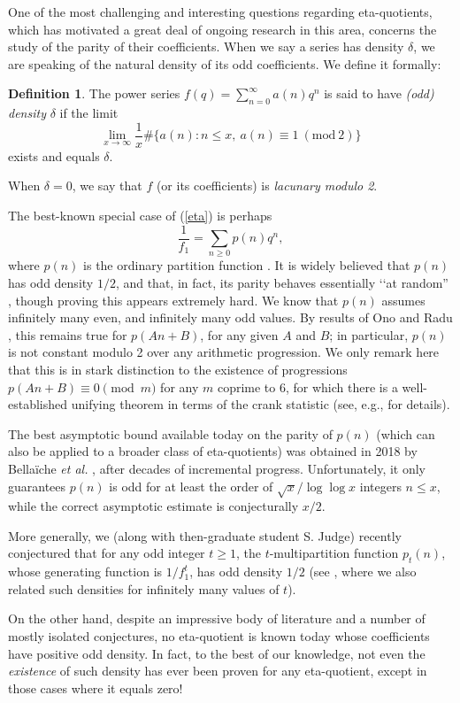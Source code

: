 \documentclass[12pt]{amsart}
\theoremstyle{definition}
\newtheorem{definition}[theorem]{Definition} %
\begin{document}
One of the most challenging and interesting questions regarding eta-quotients, which has motivated a great deal of ongoing research in this area, concerns the study of the parity of their coefficients.  When we say a series has density $\delta$, we are speaking of the natural density of its odd coefficients.  We define it formally:
\begin{definition} The power series $f(q) = \sum_{n=0}^\infty a(n) q^n$ is said to have \emph{(odd) density} $\delta$  if the limit
$$\lim_{x \rightarrow \infty} \frac{1}{x} \# \{ a(n) : n \leq x,{\ } a(n)\equiv 1{\ } (\text{mod}{\ } 2) \}$$ exists and equals $\delta$.
\end{definition}
When $\delta=0$, we say that $f$ (or its coefficients) is \emph{lacunary modulo 2}. 

The best-known special case of (\ref{eta}) is perhaps
$$\frac{1}{f_1}=\sum_{n\ge 0} p(n)q^n,$$
where $p(n)$ is the ordinary partition function \cite{Andr}. It is widely believed that $p(n)$ has odd density $1/2$, and that, in fact, its parity behaves essentially \lq \lq at random'' \cite{Calk,NiSa,PaSh}, though proving this appears extremely hard. We know that $p(n)$ assumes infinitely many even, and infinitely many odd values.  By results of Ono \cite{Ono2} and Radu \cite{Radu}, this remains true for $p(An+B)$, for any given $A$ and $B$; in particular, $p(n)$ is not constant modulo 2 over any arithmetic progression.  We only remark here that this is in stark distinction to the existence of progressions $p(An+B) \equiv 0 \pmod{m}$ for any $m$ coprime to 6, for which there is a well-established unifying theorem in terms of the crank statistic (see, e.g., \cite{Mahlburg} for details).

The best asymptotic bound available today on the parity of $p(n)$ (which can also be applied to a broader class of eta-quotients) was obtained in 2018 by Bella\"iche \emph{et al.} \cite{BGS}, after decades of incremental progress. Unfortunately, it only guarantees $p(n)$ is odd for at least the order of $\sqrt{x}/ \log \log x$ integers $n\le x$, while the correct asymptotic estimate is conjecturally $x/2$.

More generally, we (along with then-graduate student S. Judge) recently conjectured that for any odd integer $t\ge 1$, the $t$-multipartition function $p_t(n)$, whose generating function is $1/f_1^t$, has odd density $1/2$ (see \cite{JKZ,JZ}, where we also related such densities for infinitely many values of $t$). 

On the other hand, despite an impressive body of literature and a number of mostly isolated conjectures, no eta-quotient is known today whose coefficients have positive odd density. In fact, to the best of our knowledge, not even the \emph{existence} of such density has ever been proven for any eta-quotient, except in those cases where it equals zero! 
\end{document}
